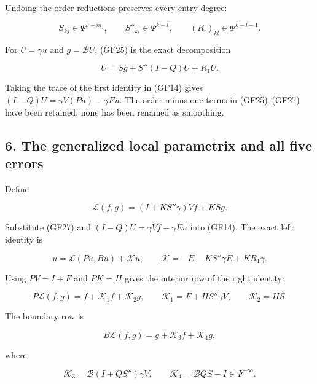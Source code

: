 \documentclass[
  11pt,
]{article}
\makeatletter
\let\ReaderOriginalAnchorStart\hyper@anchorstart
\let\ReaderOriginalAnchorEnd\hyper@anchorend
\let\ReaderPendingAliases\@empty
\def\ReaderArmAliases#1{\gdef\ReaderPendingAliases{#1}}
\def\hyper@anchorstart#1{\ReaderIfNativeAnchorTF{#1}{\ReaderPendingAliases\global\let\ReaderPendingAliases\@empty}{}\ReaderOriginalAnchorStart{#1}}
\makeatother
\begin{document}
Undoing the order reductions preserves every entry degree:

\[
 S_{kj}\in\Psi^{k-m_j},
 \qquad
 S''_{kl}\in\Psi^{k-l},
 \qquad
 (R_i)_{kl}\in\Psi^{k-l-1}.
 \tag{GF26}
\]

For \(U=\gamma u\) and \(g=\mathcal BU\), (GF25) is the exact
decomposition

\[
 U=Sg+S''(I-Q)U+R_1U.
 \tag{GF27}
\]

Taking the trace of the first identity in (GF14) gives
\((I-Q)U=\gamma V(Pu)-\gamma Eu\). The order-minus-one terms in
(GF25)--(GF27) have been retained; none has been renamed as smoothing.

\ReaderArmAliases{\ReaderOriginalAnchorStart{AN03-GCF-006}\ReaderOriginalAnchorEnd\begingroup\expandafter\def\csname @currentHref\endcsname{AN03-GCF-006}\label{AN03-GCF-006}\endgroup\ReaderOriginalAnchorStart{6-the-generalized-local-parametrix-and-all-five-errors}\ReaderOriginalAnchorEnd\begingroup\expandafter\def\csname @currentHref\endcsname{6-the-generalized-local-parametrix-and-all-five-errors}\label{6-the-generalized-local-parametrix-and-all-five-errors}\endgroup\ReaderOriginalAnchorStart{the-generalized-local-parametrix-and-all-five-errors}\ReaderOriginalAnchorEnd}
\subsection{6. The generalized local parametrix and all five
errors}\label{the-generalized-local-parametrix-and-all-five-errors}

Define

\[
 \mathscr L(f,g)=(I+KS''\gamma)Vf+KSg.
 \tag{GF28}
\]

Substitute (GF27) and \((I-Q)U=\gamma Vf-\gamma Eu\) into (GF14). The
exact left identity is

\[
 u=\mathscr L(Pu,Bu)+\mathscr Ku,
 \qquad
 \mathscr K=-E-KS''\gamma E+KR_1\gamma.
 \tag{GF29}
\]

Using \(PV=I+F\) and \(PK=H\) gives the interior row of the right
identity:

\[
 P\mathscr L(f,g)=f+\mathscr K_1f+\mathscr K_2g,
 \qquad
 \mathscr K_1=F+HS''\gamma V,
 \qquad
 \mathscr K_2=HS.
 \tag{GF30}
\]

The boundary row is

\[
 B\mathscr L(f,g)=g+\mathscr K_3f+\mathscr K_4g,
 \tag{GF31}
\]

where

\[
 \mathscr K_3=\mathcal B(I+QS'')\gamma V,
 \qquad
 \mathscr K_4=\mathcal BQS-I\in\Psi^{-\infty}.
 \tag{GF32}
\]
\end{document}
